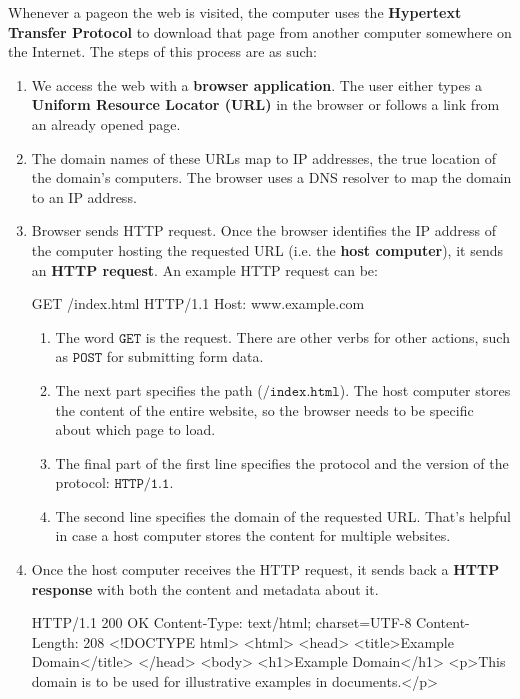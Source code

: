 \documentclass[a4paper, 12pt]{report}
\theoremstyle{remark}
\theoremstyle{definition}
\begin{document}
Whenever a pageon the web is visited, the computer uses the \textbf{Hypertext Transfer Protocol} to download that page from another computer somewhere on the Internet. The steps of this process are as such: 
\begin{enumerate}
    \item We access the web with a \textbf{browser application}. The user either types a \textbf{Uniform Resource Locator (URL)} in the browser or follows a link from an already opened page. 
    \item The domain names of these URLs map to IP addresses, the true location of the domain's computers. The browser uses a DNS resolver to map the domain to an IP address. 
    \item Browser sends HTTP request. Once the browser identifies the IP address of the computer hosting the requested URL (i.e. the \textbf{host computer}), it sends an \textbf{HTTP request}. An example HTTP request can be: 
    \begin{python}
    GET /index.html HTTP/1.1
    Host: www.example.com
    \end{python}
    \begin{enumerate}
        \item The word $\texttt{GET}$ is the request. There are other verbs for other actions, such as $\texttt{POST}$ for submitting form data. 
        \item The next part specifies the path ($\texttt{/index.html}$). The host computer stores the content of the entire website, so the browser needs to be specific about which page to load.
        \item The final part of the first line specifies the protocol and the version of the protocol: $\texttt{HTTP/1.1}$. 
        \item The second line specifies the domain of the requested URL. That's helpful in case a host computer stores the content for multiple websites.
    \end{enumerate}
    \item Once the host computer receives the HTTP request, it sends back a \textbf{HTTP response} with both the content and metadata about it. 
    \begin{python}
    HTTP/1.1 200 OK
    Content-Type: text/html; charset=UTF-8
    Content-Length: 208
    <!DOCTYPE html>
    <html>
        <head>
            <title>Example Domain</title>
        </head>
        <body>
            <h1>Example Domain</h1>
            <p>This domain is to be used for illustrative examples in documents.</p>

\end{python}
\end{enumerate}
\end{document}
